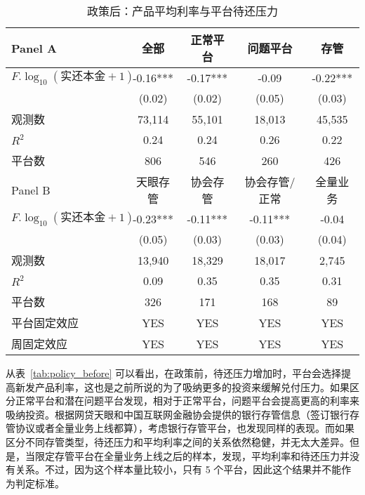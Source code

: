 \documentclass[lang=cn,11pt]{elegantpaper}
\begin{document}
\begin{table}[htbp]
  \centering
  \caption{政策后：产品平均利率与平台待还压力}
    \begin{tabular}{lcccc}
    \toprule
    Panel A & 全部    & 正常平台  & 问题平台  & 存管 \\
    \midrule
    $F.\log_{10}(\text{实还本金}+1)$ & -0.16*** & -0.17*** & -0.09 & -0.22*** \\
          & (0.02) & (0.02) & (0.05) & (0.03) \\
    观测数   & 73,114 & 55,101 & 18,013 & 45,535 \\
    $R^{2}$    & 0.24  & 0.24  & 0.26  & 0.22 \\
    平台数   & 806   & 546   & 260   & 426 \\
    \midrule
    Panel B & 天眼存管  & 协会存管  & 协会存管/正常 & 全量业务 \\
    \midrule
    $F.\log_{10}(\text{实还本金}+1)$ & -0.23*** & -0.11*** & -0.11*** & -0.04 \\
          & (0.05) & (0.03) & (0.03) & (0.04) \\
    观测数   & 13,940 & 18,329 & 18,017 & 2,745 \\
    $R^{2}$    & 0.09  & 0.35  & 0.35  & 0.31 \\
    平台数   & 326   & 171   & 168   & 89 \\
    平台固定效应 & YES   & YES   & YES   & YES \\
    周固定效应 & YES   & YES   & YES   & YES \\
    \bottomrule
    \end{tabular}%
  \label{tab:policy_after}%
\end{table}%


从表~\ref{tab:policy_before} 可以看出，在政策前，待还压力增加时，平台会选择提高新发产品利率，这也是之前所说的为了吸纳更多的投资来缓解兑付压力。如果区分正常平台和潜在问题平台发现，相对于正常平台，问题平台会提高更高的利率来吸纳投资。根据网贷天眼和中国互联网金融协会提供的银行存管信息（签订银行存管协议或者全量业务上线都算），考虑银行存管平台，也发现同样的表现。而如果区分不同存管类型，待还压力和平均利率之间的关系依然稳健，并无太大差异。但是，当限定存管平台在全量业务上线之后的样本，发现，平均利率和待还压力并没有关系。不过，因为这个样本量比较小，只有 5 个平台，因此这个结果并不能作为判定标准。
\end{document}
